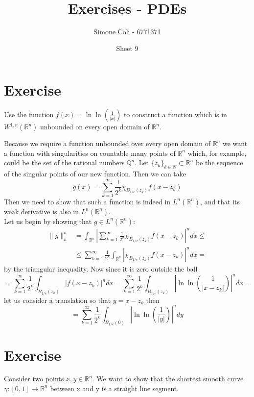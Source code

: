 \documentclass{article}
\title{Exercises - PDEs}
\author{Simone Coli - 6771371}
\date{Sheet 9}
\newcommand{\R}{\mathbb{R}}
\newcommand{\Q}{\mathbb{Q}}
\begin{document}
\maketitle

\section{Exercise}
Use the function $f(x) = \ln {\ln {\left( \frac{1}{|x|} \right)}}$ to construct a function which is in $W^{1, n}(\R^n)$ unbounded on every open domain of $\R^n$.

Because we require a function unbounded over every open domain of $\R^n$ we want a function with singularities on countable many points of $\R^n$ which, for example, could be the set of the rational numbers $\Q^n$. Let ${\{z_k\}}_{k \in N} \subset \R^n$ be the sequence of the singular points of our new function. Then we can take
\[
    g(x) = \sum_{k = 1}^{\infty} \frac{1}{2^k} \chi_{B_{1 / e}(z_k)}f(x-z_k)
\]
Then we need to show that such a function is indeed in $L^n(\R^n)$, and that its weak derivative is also in $L^n(\R^n)$.\\
Let us begin by showing that $g \in L^n(\R^n)$:
\[
    \begin{split}
        \| g \|_n^n &= \int_{\R^n} {\left| \sum_{k = 1}^{\infty} \frac{1}{2^k} \chi_{B_{1 / 2}(z_k)}f(x-z_k) \right|}^n dx \leq \\
        & \leq \sum_{k = 1}^{\infty} \frac{1}{2^k} \int_{\R^n} {\left|  \chi_{B_{1 / e}(z_k)}f(x-z_k) \right|}^n dx = 
    \end{split}
\]
by the triangular inequality. Now since it is zero outside the ball
\[
    = \sum_{k = 1}^{\infty} \frac{1}{2^k} \int_{B_{1 / e}(z_k)} {\left| f(x-z_k) \right|}^n dx = \sum_{k = 1}^{\infty} \frac{1}{2^k} \int_{B_{1 / e}(z_k)} {\left| \ln {\ln {\left( \frac{1}{|x-z_k|} \right)}} \right|}^n dx = 
\]
let us consider a translation so that $y = x - z_k$ then 
\[
    = \sum_{k = 1}^{\infty} \frac{1}{2^k} \int_{B_{1 / e}(0)} {\left| \ln {\ln {\left( \frac{1}{|y|} \right)}} \right|}^n dy
\]


\section{Exercise}
Consider two points $x, y \in \R^n$. We want to show that the shortest smooth curve $\gamma : [0, 1] \to \R^n$ between x and y is a straight line segment.
\end{document}
